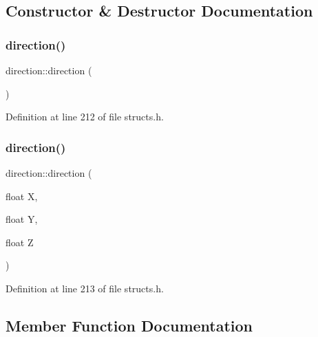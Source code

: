 \subsection{Constructor \& Destructor Documentation}
\mbox{\label{structdirection_aec63de1bc5de2b04a10ba05ccf5d1e5c}} 
\subsubsection{\texorpdfstring{direction()}{direction()}\hspace{0.1cm}{\footnotesize\ttfamily [1/2]}}
{\footnotesize\ttfamily direction\+::direction (\begin{DoxyParamCaption}{ }\end{DoxyParamCaption})\hspace{0.3cm}{\ttfamily [inline]}}



Definition at line 212 of file structs.\+h.

\mbox{\label{structdirection_aa110e167446e56347dae0ec110acd666}} 
\subsubsection{\texorpdfstring{direction()}{direction()}\hspace{0.1cm}{\footnotesize\ttfamily [2/2]}}
{\footnotesize\ttfamily direction\+::direction (\begin{DoxyParamCaption}\item[{float}]{X,  }\item[{float}]{Y,  }\item[{float}]{Z }\end{DoxyParamCaption})\hspace{0.3cm}{\ttfamily [inline]}}



Definition at line 213 of file structs.\+h.



\subsection{Member Function Documentation}
\mbox{\label{structdirection_af1cd0f36bb6f2ed44c2adc4599288b28}} 
